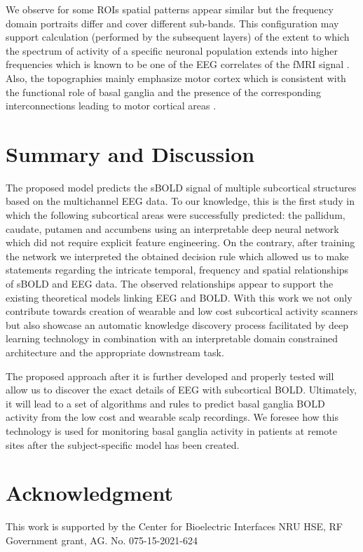 \documentclass{article}
\begin{document}
We observe for some ROIs spatial patterns appear similar but the frequency domain portraits differ and cover different sub-bands. This configuration may support calculation (performed by the subsequent layers) of the extent to which the spectrum of activity of a specific neuronal population extends into higher frequencies which is known to be one of the EEG correlates of the fMRI signal \cite{hemoeeg}. Also, the topographies mainly emphasize motor cortex which is consistent with the functional role of basal ganglia and the presence of the corresponding interconnections leading to motor cortical areas \cite{purves2001neuroscience}.

\section{Summary and Discussion}

\label{summary}

The proposed model predicts the sBOLD signal of multiple subcortical structures based on the multichannel EEG data. To our knowledge, this is the first study in which the following subcortical areas were successfully predicted: the pallidum, caudate, putamen and accumbens using an interpretable deep neural network which did not require explicit feature engineering. On the contrary, after training the network we interpreted the obtained decision rule which allowed us to make statements regarding the intricate temporal, frequency and spatial relationships of sBOLD and EEG data. The observed relationships appear to support the existing theoretical models linking EEG and BOLD.  With this work we not only contribute towards creation of wearable and low cost  subcortical activity scanners but also showcase an automatic knowledge discovery process facilitated by deep learning technology in combination with an interpretable domain constrained architecture and the appropriate downstream task. 
 
The proposed approach after it is further developed and properly tested will allow us to discover the exact details of EEG with subcortical BOLD. Ultimately, it will lead to a set of algorithms and rules to predict basal ganglia BOLD activity from the low cost and wearable scalp recordings. We foresee how this technology is used for monitoring basal ganglia activity in patients at remote sites after the subject-specific model has been created. 

\section{Acknowledgment}
This work is supported by the Center for Bioelectric Interfaces NRU HSE, RF  Government grant, AG. No. 075-15-2021-624

  








\appendix
\end{document}
